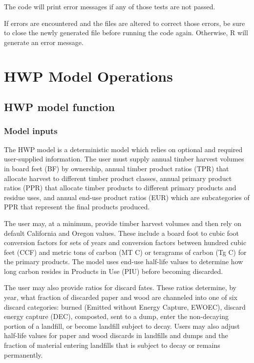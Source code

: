 \documentclass[
  openany]{book}
\begin{document}
The code will print error messages if any of those tests are not passed.

If errors are encountered and the files are altered to correct those errors, be sure to close the newly generated file before running the code again. Otherwise, R will generate an error message.

\hypertarget{model}{%
\chapter{HWP Model Operations}\label{model}}

\hypertarget{model-func}{%
\section{HWP model function}\label{model-func}}

\hypertarget{model-func-inp}{%
\subsection{Model inputs}\label{model-func-inp}}

The HWP model is a deterministic model which relies on optional and required user-supplied information. The user must supply annual timber harvest volumes in board feet (BF) by ownership, annual timber product ratios (TPR) that allocate harvest to different timber product classes, annual primary product ratios (PPR) that allocate timber products to different primary products and residue uses, and annual end-use product ratios (EUR) which are subcategories of PPR that represent the final products produced.

The user may, at a minimum, provide timber harvest volumes and then rely on default California and Oregon values. These include a board foot to cubic foot conversion factors for sets of years and conversion factors between hundred cubic feet (CCF) and metric tons of carbon (MT C) or teragrams of carbon (Tg C) for the primary products. The model uses end-use half-life values to determine how long carbon resides in Products in Use (PIU) before becoming discarded.

The user may also provide ratios for discard fates. These ratios determine, by year, what fraction of discarded paper and wood are channeled into one of six discard categories: burned (Emitted without Energy Capture, EWOEC), discard energy capture (DEC), composted, sent to a dump, enter the non-decaying portion of a landfill, or become landfill subject to decay. Users may also adjust half-life values for paper and wood discards in landfills and dumps and the fraction of material entering landfills that is subject to decay or remains permanently.
\end{document}
